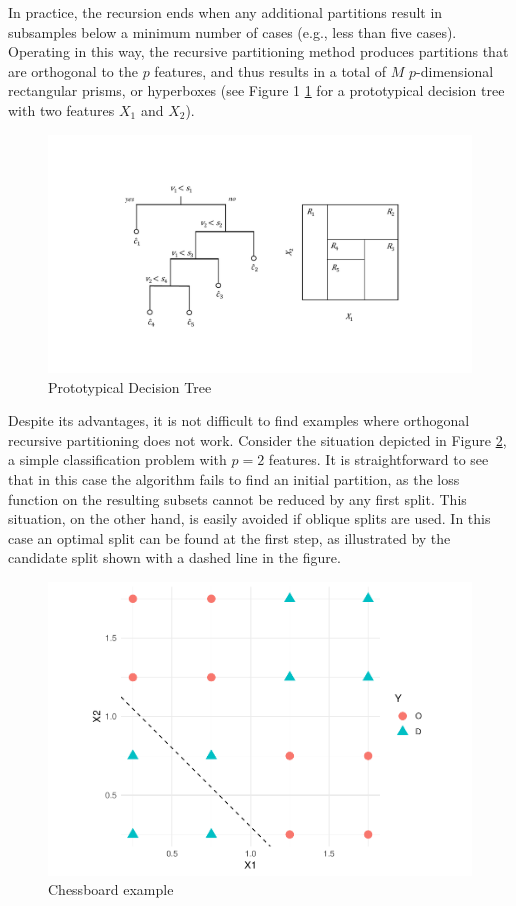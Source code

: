 \documentclass[]{elsarticle} %
\makeatletter
\def\maxwidth{\ifdim\Gin@nat@width>\linewidth\linewidth
\else\Gin@nat@width\fi}
\let\Oldincludegraphics\includegraphics
\renewcommand{\includegraphics}[1]{\Oldincludegraphics[width=\maxwidth]{#1}}
\makeatother
\begin{document}
In practice, the recursion ends when any additional partitions result in
subsamples below a minimum number of cases (e.g., less than five cases).
Operating in this way, the recursive partitioning method produces
partitions that are orthogonal to the \(p\) features, and thus results
in a total of \(M\) \(p\)-dimensional rectangular prisms, or hyperboxes
(see Figure 1 \ref{fig:fig1-example} for a prototypical decision tree
with two features \(X_1\) and \(X_2\)).

\begin{figure}
\centering
\includegraphics{fig1-example.pdf}
\caption{\label{fig:fig1-example}Prototypical Decision Tree}
\end{figure}

Despite its advantages, it is not difficult to find examples where
orthogonal recursive partitioning does not work. Consider the situation
depicted in Figure \ref{fig:fig2-chessboard}, a simple classification
problem with \(p=2\) features. It is straightforward to see that in this
case the algorithm fails to find an initial partition, as the loss
function on the resulting subsets cannot be reduced by any first split.
This situation, on the other hand, is easily avoided if oblique splits
are used. In this case an optimal split can be found at the first step,
as illustrated by the candidate split shown with a dashed line in the
figure.

\begin{figure}
\centering
\includegraphics{Trees_with_Base_Functions_v2_files/figure-latex/fig2-chessboard-1.pdf}
\caption{\label{fig:fig2-chessboard}Chessboard example}
\end{figure}
\end{document}

